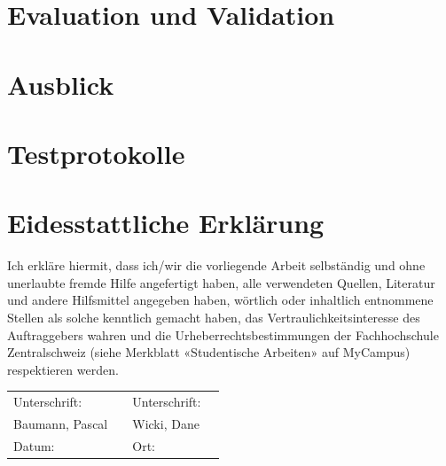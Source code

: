 \documentclass[a4paper]{scrreprt}
\begin{document}
\chapter{Evaluation und Validation}


\chapter{Ausblick}

\appendix

\chapter{Testprotokolle}



\listoffigures

\listoftables

\listofmyequations \pagebreak

\printbibliography

\chapter*{Eidesstattliche Erklärung}
Ich erkläre hiermit, dass ich/wir die vorliegende Arbeit selbständig und ohne unerlaubte fremde Hilfe angefertigt haben, alle verwendeten Quellen, Literatur und andere Hilfsmittel angegeben haben, wörtlich oder inhaltlich entnommene Stellen als solche kenntlich gemacht haben, das Vertraulichkeitsinteresse des Auftraggebers wahren und die Urheberrechtsbestimmungen der Fachhochschule Zentralschweiz (siehe Merkblatt «Studentische Arbeiten» auf MyCampus) respektieren werden.

\vspace{1em}

\renewcommand{\arraystretch}{2}
\begin{tabularx}{\textwidth}{XXXX}
	Unterschrift: & & Unterschrift: & \\ \cline{2-2}\cline{4-4}
	Baumann, Pascal & & Wicki, Dane & \\
	Datum: & & Ort: & \\
\end{tabularx}
\end{document}
